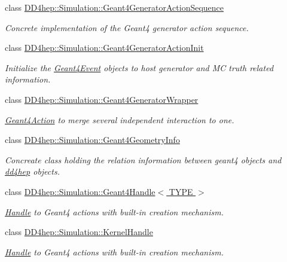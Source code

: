 \begin{DoxyCompactItemize}
class \hyperlink{class_d_d4hep_1_1_simulation_1_1_geant4_generator_action_sequence}{D\+D4hep\+::\+Simulation\+::\+Geant4\+Generator\+Action\+Sequence}
\begin{DoxyCompactList}\small\item\em Concrete implementation of the Geant4 generator action sequence. \end{DoxyCompactList}\item 
class \hyperlink{class_d_d4hep_1_1_simulation_1_1_geant4_generator_action_init}{D\+D4hep\+::\+Simulation\+::\+Geant4\+Generator\+Action\+Init}
\begin{DoxyCompactList}\small\item\em Initialize the \hyperlink{class_d_d4hep_1_1_simulation_1_1_geant4_event}{Geant4\+Event} objects to host generator and MC truth related information. \end{DoxyCompactList}\item 
class \hyperlink{class_d_d4hep_1_1_simulation_1_1_geant4_generator_wrapper}{D\+D4hep\+::\+Simulation\+::\+Geant4\+Generator\+Wrapper}
\begin{DoxyCompactList}\small\item\em \hyperlink{class_d_d4hep_1_1_simulation_1_1_geant4_action}{Geant4\+Action} to merge several independent interaction to one. \end{DoxyCompactList}\item 
class \hyperlink{class_d_d4hep_1_1_simulation_1_1_geant4_geometry_info}{D\+D4hep\+::\+Simulation\+::\+Geant4\+Geometry\+Info}
\begin{DoxyCompactList}\small\item\em Concreate class holding the relation information between geant4 objects and \hyperlink{namespacedd4hep}{dd4hep} objects. \end{DoxyCompactList}\item 
class \hyperlink{class_d_d4hep_1_1_simulation_1_1_geant4_handle}{D\+D4hep\+::\+Simulation\+::\+Geant4\+Handle$<$ T\+Y\+P\+E $>$}
\begin{DoxyCompactList}\small\item\em \hyperlink{class_d_d4hep_1_1_handle}{Handle} to Geant4 actions with built-\/in creation mechanism. \end{DoxyCompactList}\item 
class \hyperlink{class_d_d4hep_1_1_simulation_1_1_kernel_handle}{D\+D4hep\+::\+Simulation\+::\+Kernel\+Handle}
\begin{DoxyCompactList}\small\item\em \hyperlink{class_d_d4hep_1_1_handle}{Handle} to Geant4 actions with built-\/in creation mechanism. \end{DoxyCompactList}\item 

\end{DoxyCompactItemize}
